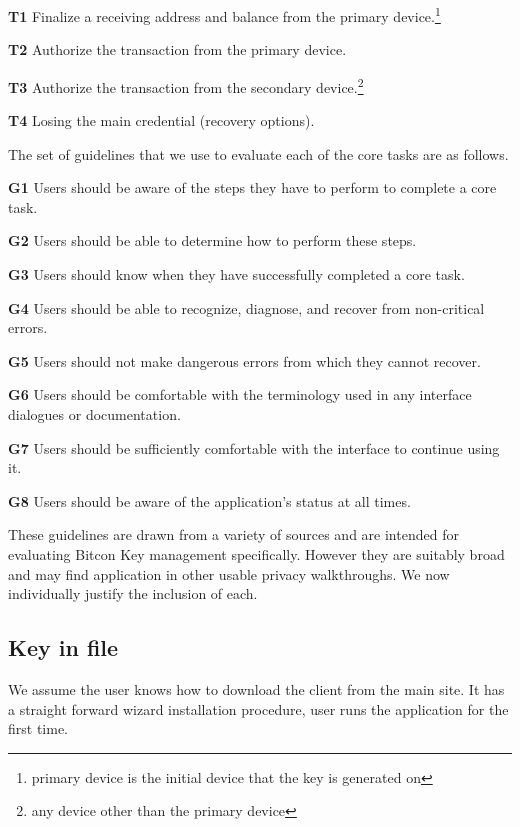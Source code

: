 \begin{compactlist}
	\item[\bf T1] Finalize a receiving address and balance from the primary device.\footnote{primary device is the initial device that the key is generated on}\label{sec:ct-1}
	\item[\bf T2] Authorize the transaction from the primary device.\label{sec:ct-2}
	\item[\bf T3] Authorize the transaction from the secondary device.\footnote{any device other than the primary device}\label{sec:ct-2}
	\item[\bf T4] Losing the main credential (recovery options).\label{sec:ct-2}
\end{compactlist}

The set of guidelines that we use to evaluate each of the core tasks are as follows.
	
\begin{compactlist}
	\item[\bf G1] Users should be aware of the steps they have to perform to complete a core task.
	\item[\bf G2] Users should be able to determine how to perform these steps.
	\item[\bf G3] Users should know when they have successfully completed a core task.
	\item[\bf G4] Users should be able to recognize, diagnose, and recover from non-critical errors.
	\item[\bf G5] Users should not make dangerous errors from which they cannot recover.
	\item[\bf G6] Users should be comfortable with the terminology used in any interface dialogues or documentation.
	\item[\bf G7] Users should be sufficiently comfortable with the interface to continue using it.
	\item[\bf G8] Users should be aware of the application's status at all times.
\end{compactlist}

These guidelines are drawn from a variety of sources \cite{cw,johnny,karat,p3p,pvo,clark} and are intended for evaluating Bitcon Key management specifically. However they are suitably broad and may find application in other usable privacy walkthroughs. We now individually justify the inclusion of each.


\subsection{Key in file}
We assume the user knows how to download the client from the main site. It has a straight forward wizard installation procedure, user runs the application for the first time. 

